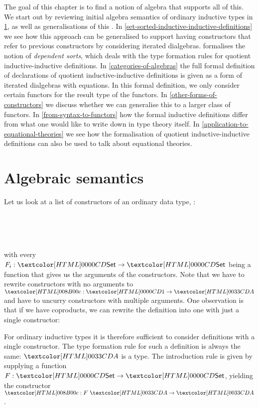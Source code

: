 The goal of this chapter is to find a notion of algebra that supports
all of this. We start out by reviewing initial algebra semantics of
ordinary inductive types in \cref{algebraic-semantics}, as well as
generalisations of this . In
\cref{set-sorted-inductive-inductive-definitions} we see how this
approach can be generalised to support having constructors that refer
to previous constructors by considering iterated
dialgebras.  formalises the notion of
\emph{dependent sorts}, which deals with the type formation rules for
quotient inductive-inductive definitions. In
\cref{categories-of-algebras} the full formal definition of
declarations of quotient inductive-inductive definitions is given as a
form of iterated dialgebras with equations. In this formal definition,
we only consider certain functors for the result type of the
functors. In \cref{other-forms-of-constructors} we discuss whether we
can generalise this to a larger class of functors. In
\cref{from-syntax-to-functors} how the formal inductive definitions
differ from what one would like to write down in type theory
itself. In \cref{application-to-equational-theories} we see how the
formalisation of quotient inductive-inductive definitions can also be
used to talk about equational theories.

\section{Algebraic semantics}
\label{algebraic-semantics}

Let us look at a list of constructors of an ordinary data type, \eg:
%
\begin{datatype}{\Aty}{\Set}
   \\
   \\
  \constrdots \\
\end{datatype}
%
with every $F_i : \Set \to \Set$ being a function that gives us the
arguments of the constructors. Note that we have to rewrite
constructors with no arguments to $\Ac : \unitty \to \Aty$ and have to
uncurry constructors with multiple arguments. One observation is that
if we have coproducts, we can rewrite the definition into one with
just a single constructor:
%
\begin{datatype}{\Aty}{\Set}
\end{datatype}
%
For ordinary inductive types it is therefore sufficient to consider
definitions with a single constructor. The type formation rule for
such a definition is always the same: $\Aty$ is a type. The
introduction rule is given by supplying a function
$F : \Set \to \Set$, yielding the constructor
$\Ac : F\ \Aty \to \Aty$.

